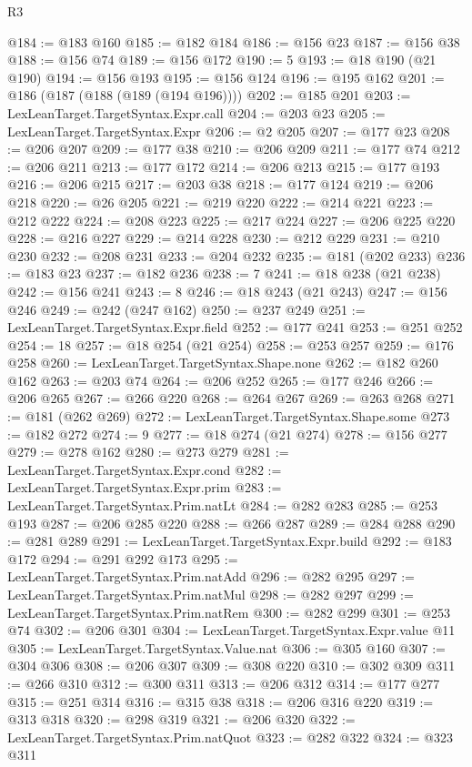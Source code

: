 \begin{lexlean}{R3}
\begin{coremodule}
@184 := @183 @160
@185 := @182 @184
@186 := @156 @23
@187 := @156 @38
@188 := @156 @74
@189 := @156 @172
@190 := 5
@193 := @18 @190 (@21 @190)
@194 := @156 @193
@195 := @156 @124
@196 := @195 @162
@201 := @186 (@187 (@188 (@189 (@194 @196))))
@202 := @185 @201
@203 := LexLeanTarget.TargetSyntax.Expr.call
@204 := @203 @23
@205 := LexLeanTarget.TargetSyntax.Expr
@206 := @2 @205
@207 := @177 @23
@208 := @206 @207
@209 := @177 @38
@210 := @206 @209
@211 := @177 @74
@212 := @206 @211
@213 := @177 @172
@214 := @206 @213
@215 := @177 @193
@216 := @206 @215
@217 := @203 @38
@218 := @177 @124
@219 := @206 @218
@220 := @26 @205
@221 := @219 @220
@222 := @214 @221
@223 := @212 @222
@224 := @208 @223
@225 := @217 @224
@227 := @206 @225 @220
@228 := @216 @227
@229 := @214 @228
@230 := @212 @229
@231 := @210 @230
@232 := @208 @231
@233 := @204 @232
@235 := @181 (@202 @233)
@236 := @183 @23
@237 := @182 @236
@238 := 7
@241 := @18 @238 (@21 @238)
@242 := @156 @241
@243 := 8
@246 := @18 @243 (@21 @243)
@247 := @156 @246
@249 := @242 (@247 @162)
@250 := @237 @249
@251 := LexLeanTarget.TargetSyntax.Expr.field
@252 := @177 @241
@253 := @251 @252
@254 := 18
@257 := @18 @254 (@21 @254)
@258 := @253 @257
@259 := @176 @258
@260 := LexLeanTarget.TargetSyntax.Shape.none
@262 := @182 @260 @162
@263 := @203 @74
@264 := @206 @252
@265 := @177 @246
@266 := @206 @265
@267 := @266 @220
@268 := @264 @267
@269 := @263 @268
@271 := @181 (@262 @269)
@272 := LexLeanTarget.TargetSyntax.Shape.some
@273 := @182 @272
@274 := 9
@277 := @18 @274 (@21 @274)
@278 := @156 @277
@279 := @278 @162
@280 := @273 @279
@281 := LexLeanTarget.TargetSyntax.Expr.cond
@282 := LexLeanTarget.TargetSyntax.Expr.prim
@283 := LexLeanTarget.TargetSyntax.Prim.natLt
@284 := @282 @283
@285 := @253 @193
@287 := @206 @285 @220
@288 := @266 @287
@289 := @284 @288
@290 := @281 @289
@291 := LexLeanTarget.TargetSyntax.Expr.build
@292 := @183 @172
@294 := @291 @292 @173
@295 := LexLeanTarget.TargetSyntax.Prim.natAdd
@296 := @282 @295
@297 := LexLeanTarget.TargetSyntax.Prim.natMul
@298 := @282 @297
@299 := LexLeanTarget.TargetSyntax.Prim.natRem
@300 := @282 @299
@301 := @253 @74
@302 := @206 @301
@304 := LexLeanTarget.TargetSyntax.Expr.value @11
@305 := LexLeanTarget.TargetSyntax.Value.nat
@306 := @305 @160
@307 := @304 @306
@308 := @206 @307
@309 := @308 @220
@310 := @302 @309
@311 := @266 @310
@312 := @300 @311
@313 := @206 @312
@314 := @177 @277
@315 := @251 @314
@316 := @315 @38
@318 := @206 @316 @220
@319 := @313 @318
@320 := @298 @319
@321 := @206 @320
@322 := LexLeanTarget.TargetSyntax.Prim.natQuot
@323 := @282 @322
@324 := @323 @311

\end{coremodule}
\end{lexlean}
